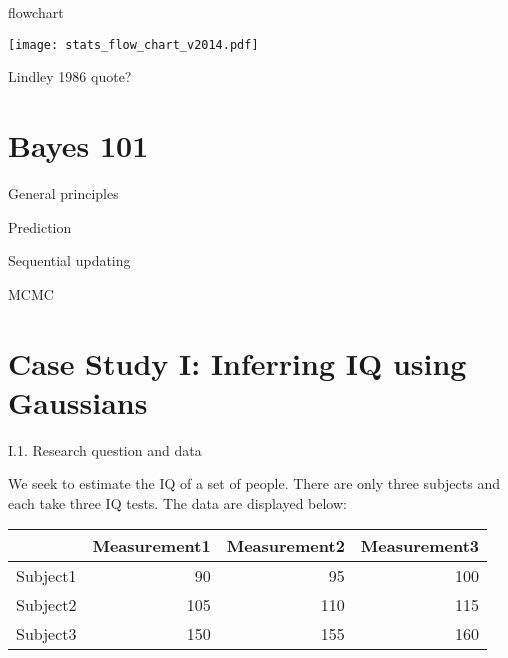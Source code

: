 \documentclass[ignorenonframetext,]{beamer}
\begin{document}
\begin{frame}{%
\protect\hypertarget{flowchart}{%
flowchart}}

\texttt{[image: stats\_flow\_chart\_v2014.pdf]}

\end{frame}

\begin{frame}{%
\protect\hypertarget{lindley-1986-quote}{%
Lindley 1986 quote?}}

\end{frame}

\hypertarget{bayes-101}{%
\section{Bayes 101}\label{bayes-101}}

\begin{frame}{%
\protect\hypertarget{general-principles}{%
General principles}}

\end{frame}

\begin{frame}{%
\protect\hypertarget{prediction}{%
Prediction}}

\end{frame}

\begin{frame}{%
\protect\hypertarget{sequential-updating}{%
Sequential updating}}

\end{frame}

\begin{frame}{%
\protect\hypertarget{mcmc}{%
MCMC}}

\end{frame}

\hypertarget{case-study-i-inferring-iq-using-gaussians}{%
\section{Case Study I: Inferring IQ using
Gaussians}\label{case-study-i-inferring-iq-using-gaussians}}

\begin{frame}{%
\protect\hypertarget{i.1.-research-question-and-data}{%
I.1. Research question and data}}

We seek to estimate the IQ of a set of people. There are only three
subjects and each take three IQ tests. The data are displayed below:

\begin{longtable}[]{@{}lrrr@{}}
\toprule
& Measurement1 & Measurement2 & Measurement3\tabularnewline
\midrule
\endhead
Subject1 & 90 & 95 & 100\tabularnewline
Subject2 & 105 & 110 & 115\tabularnewline
Subject3 & 150 & 155 & 160\tabularnewline
\bottomrule
\end{longtable}

\end{frame}
\end{document}
